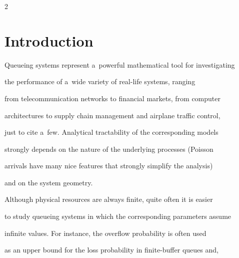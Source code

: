 \vspace*{9pt}













      \thispagestyle{myheadings}





      \begin{multicols}{2}





                  \label{st\stat}





\section{Introduction}





\noindent


Queueing systems represent a~powerful mathematical tool for investigating 


the performance of a~wide variety of real-life systems, ranging 


from telecommunication networks to financial markets, from computer 


architectures to supply chain management and airplane traffic control, 


just to cite a~few. Analytical tractability of the corresponding models 


strongly depends on the nature of the underlying processes (Poisson 


arrivals have many nice features that strongly simplify the analysis) 


and on the system geometry.





Although physical resources are always finite, quite often it is easier 


to study queueing systems in which the corresponding parameters assume 


infinite values. For instance, the overflow probability is often used 


as an upper bound for the loss probability in finite-buffer queues and, 



\end{multicols}
